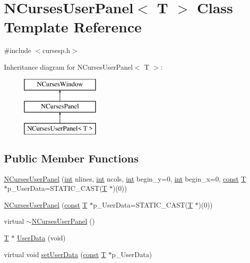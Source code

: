 \hypertarget{class_n_curses_user_panel}{\section{N\-Curses\-User\-Panel$<$ T $>$ Class Template Reference}
\label{class_n_curses_user_panel}
}


{\ttfamily \#include $<$cursesp.\-h$>$}

Inheritance diagram for N\-Curses\-User\-Panel$<$ T $>$\-:\begin{figure}[H]
\begin{center}
\leavevmode
\includegraphics[height=3.000000cm]{class_n_curses_user_panel}
\end{center}
\end{figure}
\subsection*{Public Member Functions}
\begin{DoxyCompactItemize}
\item 
\hyperlink{class_n_curses_user_panel_a4d4d8fcbc1c98b164f8ac95a702ccff0}{N\-Curses\-User\-Panel} (\hyperlink{term__entry_8h_ad65b480f8c8270356b45a9890f6499ae}{int} nlines, \hyperlink{term__entry_8h_ad65b480f8c8270356b45a9890f6499ae}{int} ncols, \hyperlink{term__entry_8h_ad65b480f8c8270356b45a9890f6499ae}{int} begin\-\_\-y=0, \hyperlink{term__entry_8h_ad65b480f8c8270356b45a9890f6499ae}{int} begin\-\_\-x=0, \hyperlink{term__entry_8h_a57bd63ce7f9a353488880e3de6692d5a}{const} \hyperlink{curses_8priv_8h_a5ef253115820acf7d27f3c5c3b02a0f0}{T} $\ast$p\-\_\-\-User\-Data=S\-T\-A\-T\-I\-C\-\_\-\-C\-A\-S\-T(\hyperlink{curses_8priv_8h_a5ef253115820acf7d27f3c5c3b02a0f0}{T} $\ast$)(0))
\item 
\hyperlink{class_n_curses_user_panel_abb784752ae44c559df6f338b86e98bd9}{N\-Curses\-User\-Panel} (\hyperlink{term__entry_8h_a57bd63ce7f9a353488880e3de6692d5a}{const} \hyperlink{curses_8priv_8h_a5ef253115820acf7d27f3c5c3b02a0f0}{T} $\ast$p\-\_\-\-User\-Data=S\-T\-A\-T\-I\-C\-\_\-\-C\-A\-S\-T(\hyperlink{curses_8priv_8h_a5ef253115820acf7d27f3c5c3b02a0f0}{T} $\ast$)(0))
\item 
virtual \hyperlink{class_n_curses_user_panel_a3e05d80ba8edd31f8e39b76cd6455ba8}{$\sim$\-N\-Curses\-User\-Panel} ()
\item 
\hyperlink{curses_8priv_8h_a5ef253115820acf7d27f3c5c3b02a0f0}{T} $\ast$ \hyperlink{class_n_curses_user_panel_a008f1247455af73c68289c38b8cac0ee}{User\-Data} (void)
\item 
virtual void \hyperlink{class_n_curses_user_panel_ae3baef33c22ec0c6f81ad042264748e8}{set\-User\-Data} (\hyperlink{term__entry_8h_a57bd63ce7f9a353488880e3de6692d5a}{const} \hyperlink{curses_8priv_8h_a5ef253115820acf7d27f3c5c3b02a0f0}{T} $\ast$p\-\_\-\-User\-Data)
\end{DoxyCompactItemize}
